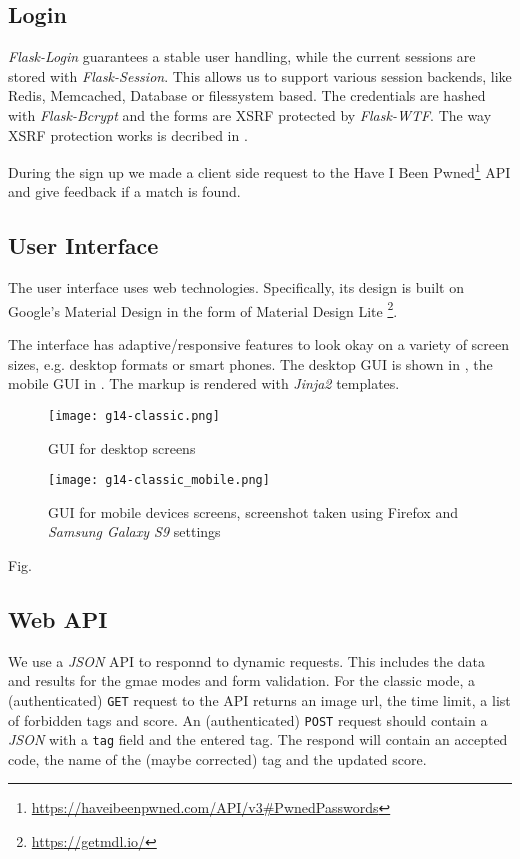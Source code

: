 \subsection{Login}
\label{g14:sec:implementation:login}
\textit{Flask-Login} guarantees a stable user handling, while the current sessions are stored with \textit{Flask-Session}. This allows us to support various session backends, like Redis, Memcached, Database or filessystem based. The credentials are hashed with \textit{Flask-Bcrypt} and the forms are XSRF protected by \textit{Flask-WTF}. The way XSRF protection works is decribed in \cite{4198791}. 

During the sign up we made a client side request to the Have I Been Pwned\footnote{\url{https://haveibeenpwned.com/API/v3\#PwnedPasswords}} API and give feedback if a match is found.

\subsection{User Interface}
\label{g14:sec:implementation:UI}

The user interface uses web technologies. Specifically, its design is built on Google's Material Design in the form of Material Design Lite \footnote{\url{https://getmdl.io/}}.

The interface has adaptive/responsive features to look okay on a variety of screen sizes, e.g. desktop formats or smart phones. The desktop GUI is shown in , the mobile GUI in .
The markup is rendered with \textit{Jinja2} templates.




\begin{figure}[tb]
\centering
\texttt{[image: g14-classic.png]}
\caption{GUI for desktop screens}
\label{g14:fig:guiclassicdesktop}
\end{figure}


\begin{figure}[tb]
\centering
\texttt{[image: g14-classic\_mobile.png]}
\caption{GUI for mobile devices screens, screenshot taken using Firefox and \textit{Samsung Galaxy S9} settings}
\label{g14:fig:guiclassicmobile}
\end{figure}

Fig. 


\subsection{Web API}
\label{g14:sec:implementation:API}
We use a \textit{JSON} API to responnd to dynamic requests. This includes the data and results for the gmae modes and form validation.
For the classic mode, a (authenticated) \texttt{GET} request to the API returns an image url, the time limit, a list of forbidden tags and score.
An (authenticated) \texttt{POST} request should contain a \textit{JSON} with a \texttt{tag} field and the entered tag. The respond will contain an accepted code, the name of the (maybe corrected) tag and the updated score.

